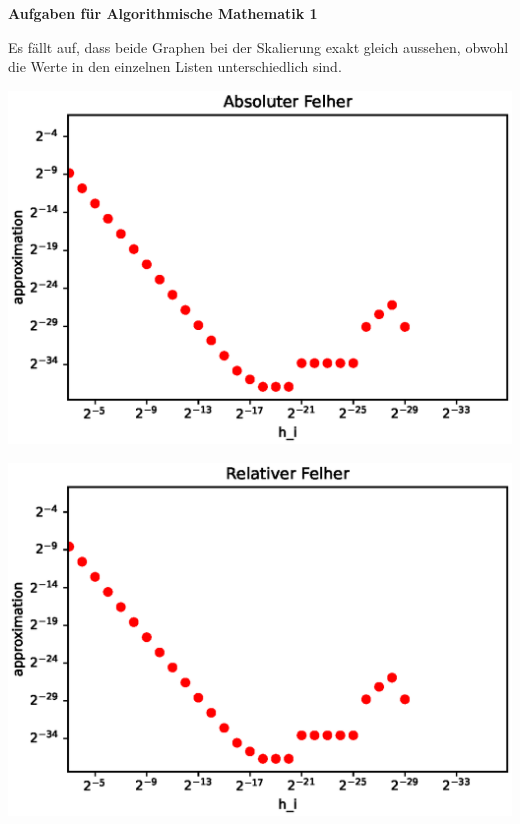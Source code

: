 \documentclass[a4paper,oneside,11pt]{scrartcl}
\begin{document}

\begin{center}
{\Large{\textbf{Aufgaben für Algorithmische Mathematik 1}}} \\
\end{center}
Es fällt auf, dass beide Graphen bei der Skalierung exakt gleich aussehen, obwohl die Werte in den einzelnen Listen unterschiedlich sind.\\
\begin{minipage}[t]{\textwidth}
\includegraphics[]{abs_error.eps}
\end{minipage}
\pagebreak
\begin{minipage}[t]{\textwidth}
\includegraphics[]{rel_error.eps}
\end{minipage}
\end{document}

